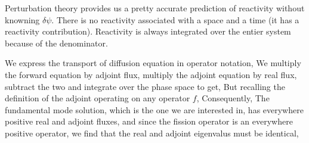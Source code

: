 \documentclass{school-22.211-notes}
\date{May 12, 2012}
\begin{document}
\maketitle


\label{adjoint-fluxes}
Perturbation theory provides us a pretty accurate prediction of reactivity without knowning $\delta \psi$. There is no reactivity associated with a space and a time (it has a reactivity contribution). Reactivity is always integrated over the entier system because of the denominator. 

We express the transport of diffusion equation in operator notation, 
We multiply the forward equation by adjoint flux, multiply the adjoint equation by real flux, subtract the two and integrate over the phase space to get, 
But recalling the definition of the adjoint operating on any operator $f$, 
Consequently, 
The fundamental mode solution, which is the one we are interested in, has everywhere positive real and adjoint fluxes, and since the fission operator is an everywhere positive operator, we find that the real and adjoint eigenvalus must be identical,
\end{document}
